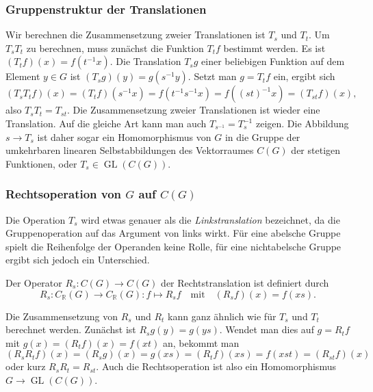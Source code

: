 %
%
\subsubsection{Gruppenstruktur der Translationen}
Wir berechnen die Zusammensetzung zweier Translationen ist $T_s$ und $T_t$.
Um $T_sT_t$ zu berechnen, muss zunächst die Funktion $T_tf$ bestimmt werden.
Es ist $(T_tf)(x) = f(t^{-1}x)$.
Die Translation $T_sg$ einer beliebigen Funktion auf dem Element $y\in G$
ist $(T_sg)(y)=g(s^{-1}y)$.
Setzt man $g=T_tf$ ein, ergibt sich
\[
(T_sT_tf)(x)
=
(T_tf)(s^{-1}x)
=
f(t^{-1}s^{-1}x)
=
f((st)^{-1}x)
=
(T_{st}f)(x),
\]
also $T_sT_t=T_{st}$.
Die Zusammensetzung zweier Translationen ist wieder eine Translation.
Auf die gleiche Art kann man auch $T_{s^{-1}}=T_s^{-1}$ zeigen.
Die Abbildung $s\to T_s$ ist daher sogar ein Homomorphismus von $G$
in die Gruppe der umkehrbaren linearen Selbstabbildungen
des Vektorraumes $C(G)$ der stetigen Funktionen, oder
$T_s\in\operatorname{GL}(C(G))$.

%
%
\subsubsection{Rechtsoperation von $G$ auf $C(G)$}
Die Operation $T_s$ wird etwas genauer als die {\em Linkstranslation}
bezeichnet, da die Gruppenoperation auf das Argument von links wirkt.
Für eine abelsche Gruppe spielt die Reihenfolge der Operanden keine
Rolle, für eine nichtabelsche Gruppe ergibt sich jedoch ein Unterschied.

\begin{definition}[Rechtsoperation]
Der Operator $R_s\colon C(G)\to C(G)$ der Rechtstranslation ist definiert
durch
\[
R_s
\colon
C_{\mathbb{R}}(G)\to C_{\mathbb{R}}(G)
:
f \mapsto R_sf
\quad\text{mit}\quad
(R_sf)(x) = f(xs).
\]
\end{definition}

Die Zusammensetzung von $R_s$ und $R_t$ kann ganz ähnlich wie für
$T_s$ und $T_t$ berechnet werden.
Zunächst ist $R_sg(y) = g(ys)$.
Wendet man dies auf $g=R_tf$ mit $g(x)=(R_tf)(x)=f(xt)$ an, bekommt man
\[
(R_sR_tf)(x)
=
(R_sg)(x)
=
g(xs)
=
(R_tf)(xs)
=
f(xst)
=
(R_{st}f)(x)
\]
oder kurz $R_sR_t=R_{st}$.
Auch die Rechtsoperation ist also ein Homomorphismus
$G\to\operatorname{GL}(C(G))$.



